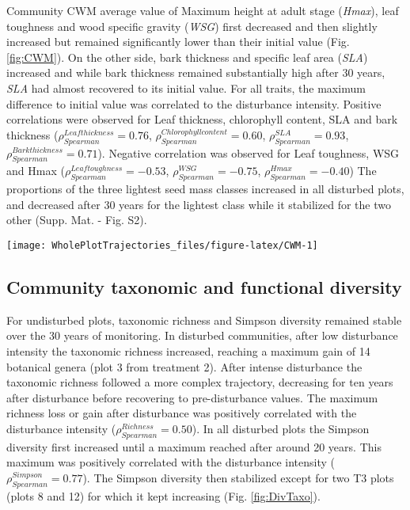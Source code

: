 \documentclass[fleqn,10pt]{ArtEcoFoG} %
\begin{document}
Community CWM average value of Maximum height at adult stage
(\emph{Hmax}), leaf toughness and wood specific gravity (\emph{WSG})
first decreased and then slightly increased but remained significantly
lower than their initial value (Fig. \ref{fig:CWM}). On the other side,
bark thickness and specific leaf area (\emph{SLA}) increased and while
bark thickness remained substantially high after 30 years, \emph{SLA}
had almost recovered to its initial value. For all traits, the maximum
difference to initial value was correlated to the disturbance intensity.
Positive correlations were observed for Leaf thickness, chlorophyll
content, SLA and bark thickness
(\(\rho_{Spearman}^{Leaf thickness}=0.76\),
\(\rho_{Spearman}^{Chlorophyll content}=0.60\),
\(\rho_{Spearman}^{SLA}=0.93\),
\(\rho_{Spearman}^{Bark thickness}=0.71\)). Negative correlation was
observed for Leaf toughness, WSG and Hmax
(\(\rho_{Spearman}^{Leaf toughness}=-0.53\),
\(\rho_{Spearman}^{WSG}=-0.75\), \(\rho_{Spearman}^{Hmax}=-0.40\)) The
proportions of the three lightest seed mass classes increased in all
disturbed plots, and decreased after 30 years for the lightest class
while it stabilized for the two other (Supp. Mat. - Fig. S2).

\begin{figure*}

{\centering \texttt{[image: WholePlotTrajectories\_files/figure-latex/CWM-1]} 

}

\caption{Trajectories of community weighted means over 30 years after disturbance of four leaf traits (Leaf thickness, chlorophyll content, toughness, and specific area), two stem traits (wood specific gravity, and bark thickness) and one life history trait (Specific maximum height at adult stage). }\label{fig:CWM}
\end{figure*}

\subsection{Community taxonomic and functional
diversity}\label{community-taxonomic-and-functional-diversity}

For undisturbed plots, taxonomic richness and Simpson diversity remained
stable over the 30 years of monitoring. In disturbed communities, after
low disturbance intensity the taxonomic richness increased, reaching a
maximum gain of 14 botanical genera (plot 3 from treatment 2). After
intense disturbance the taxonomic richness followed a more complex
trajectory, decreasing for ten years after disturbance before recovering
to pre-disturbance values. The maximum richness loss or gain after
disturbance was positively correlated with the disturbance intensity
(\(\rho_{Spearman}^{Richness}=0.50\)). In all disturbed plots the
Simpson diversity first increased until a maximum reached after around
20 years. This maximum was positively correlated with the disturbance
intensity (\(\rho_{Spearman}^{Simpson}=0.77\)). The Simpson diversity
then stabilized except for two T3 plots (plots 8 and 12) for which it
kept increasing (Fig. \ref{fig:DivTaxo}).
\end{document}
